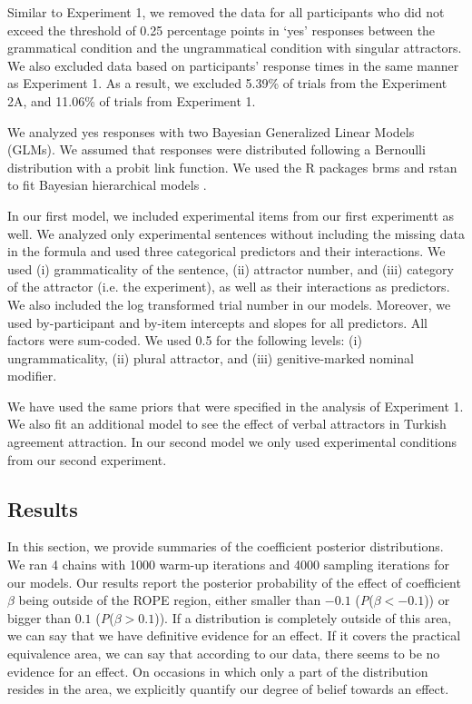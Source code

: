 Similar to Experiment 1, we removed the data for all participants who did not exceed the threshold of 0.25 percentage points in `yes' responses between the grammatical condition and the ungrammatical condition with singular attractors. We also excluded data based on participants' response times in the same manner as Experiment 1. As a result, we excluded 5.39\% of trials from the Experiment 2A, and 11.06\% of trials from Experiment 1.

We analyzed yes responses with two Bayesian Generalized Linear Models (GLMs). We assumed that responses were distributed following a Bernoulli distribution with a probit link function. We used the R packages brms \citep{R-brms_a,R-brms_b} and rstan \citep{R-rstan} to fit Bayesian hierarchical models \citep[e.g.,][]{GelmanHill:2007, NicenboimVasishth:2016}. 

In our first model, we included experimental items from our first experimentt as well. We analyzed only experimental sentences without including the missing data in the formula and used three categorical predictors and their interactions. We used (i) grammaticality of the sentence, (ii) attractor number, and (iii) category of the attractor (i.e. the experiment), as well as their interactions as predictors. We also included the log transformed trial number in our models. Moreover, we used by-participant and by-item intercepts and slopes for all predictors. All factors were sum-coded. We used 0.5 for the following levels: (i) ungrammaticality, (ii) plural attractor, and (iii) genitive-marked nominal modifier. 

We have used the same priors that were specified in the analysis of Experiment 1. We also fit an additional model to see the effect of verbal attractors in Turkish agreement attraction. In our second model we only used experimental conditions from our second experiment. 


\subsection{Results}

In this section, we provide summaries of the coefficient posterior distributions. We ran 4 chains with 1000 warm-up iterations and 4000 sampling iterations for our models. Our results report the posterior probability of the effect of coefficient $\beta$ being outside of the ROPE region, either smaller than $-0.1$ (\emph{P}($\beta < -0.1$)) or bigger than $0.1$ (\emph{P}($\beta > 0.1$)). If a distribution is completely outside of this area, we can say that we have definitive evidence for an effect. If it covers the practical equivalence area, we can say that according to our data, there seems to be no evidence for an effect. On occasions in which only a part of the distribution resides in the area, we explicitly quantify our degree of belief towards an effect. 

